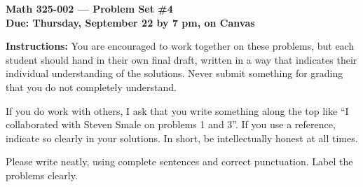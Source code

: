 \documentclass{amsart}
\begin{document}
\begin{center}
{\large\bfseries
Math 325-002 --- Problem Set \#4 \\
Due: Thursday, September 22 by 7 pm, on Canvas}
\end{center}





{\bf Instructions:} You are encouraged to work together on these
problems, but each student should hand in their own final draft,
written in a way that indicates their individual understanding of
the solutions. Never submit something for grading
that you do not completely understand. 

If you do work with others, I ask that you write something along the
top like ``I collaborated with Steven Smale on problems 1 and 3''.
If you use a reference, indicate so clearly in your solutions. 
In short, be intellectually
honest at all times.

Please write neatly, using complete sentences and correct
punctuation. Label the problems clearly. 
\end{document}

